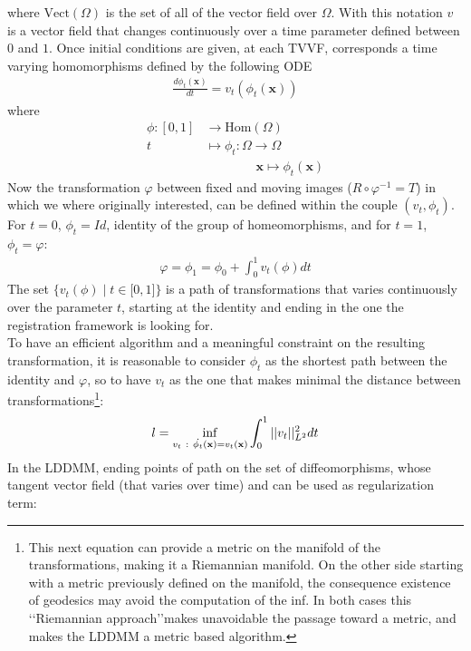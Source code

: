 where $\text{Vect}(\Omega)$ is the set of all of the vector field over $\Omega$. With this notation $v$ is a vector field that changes continuously over a time parameter defined between $0$  and $1$. Once initial conditions are given, at each TVVF, corresponds a time varying homomorphisms defined  by the following ODE 
\begin{align}\label{eq:ode_phi_v}
\frac{d\phi_{t} (\mathbf{x})}{dt} = v_{t}(\phi_{t}(\mathbf{x} ))
\end{align}
where 
\begin{align*}
\phi : [0,1] & \longrightarrow  \text{Hom}(\Omega)\\
t  &\longmapsto \phi_{t}  : \Omega \longrightarrow    \Omega \\
& \qquad \quad \quad  \mathbf{x} \longmapsto \phi_{t}  (\mathbf{x} )
\end{align*}
Now the transformation $\varphi$ between fixed and moving images ($ R\circ \varphi^{-1} = T $) in which we where originally interested, can be defined within the couple $(v_{t},\phi_{t})$.  For $t = 0$, $\phi_{t} = Id$, identity of the group of homeomorphisms, and for $t = 1$, $\phi_{t} = \varphi$:
\begin{align*}
\varphi = \phi_{1} = \phi_{0} + \int_0^1 v_{t} (\phi) dt
\end{align*}
The set $\{ v_{t} (\phi) \mid t \in \lbrack 0,1 \rbrack \}$ is a path of transformations that varies continuously over the parameter $t$, starting at the identity and ending in the one the registration framework is looking for.\\
To have an efficient algorithm and a meaningful constraint on the resulting transformation, it is reasonable to consider $\phi_{t}$ as the shortest path between the identity and $\varphi$, so to have $v_{t} $ as the one that makes minimal the distance between transformations\footnote{This next equation can provide a metric on the manifold of the transformations, making it a Riemannian manifold. On the other side starting with a metric previously defined on the manifold, the consequence existence of geodesics may avoid the computation of the inf. In both cases this \lq\lq Riemannian approach\rq\rq  makes unavoidable the passage toward a metric, and makes the LDDMM a metric based algorithm.}:
\begin{align*}
l = \inf_{v_{t} ~ : ~ \dot{\phi_{t}} (\mathbf{x}) = v_{t}(\mathbf{x} )}  \int_{0}^{1} \vert\lvert v_{t} \rvert\vert_{L^2}^{2}dt
\end{align*}
In the LDDMM, ending points of path on the set of diffeomorphisms, whose tangent vector field (that varies over time) and can be used as regularization term:
